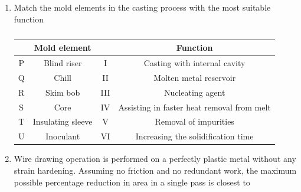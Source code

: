 \documentclass[journal]{IEEEtran}
\begin{document}
\begin{enumerate}[leftmargin=0pt]
\begin{enumerate}
\end{enumerate}
\hfill{}

\item
Match the mold elements in the casting process with the most suitable function
\begin{table}[ht]
\centering
\caption*{}
\label{tab:mold-match}
\begin{tabular}{|c|c|c|c|}
\hline
&Mold element & &Function\\
\hline
P &Blind riser & I& Casting with internal cavity\\
\hline
Q& Chill      & II& Molten metal reservoir\\
\hline
R& Skim bob  & III &Nucleating agent\\
\hline
S &Core      & IV &Assisting in faster heat removal from melt\\
\hline
T &Insulating sleeve & V& Removal of impurities\\
\hline
U& Inoculant  & VI& Increasing the solidification time\\
\hline
\end{tabular}
\end{table}
\begin{enumerate}
\end{enumerate}
\hfill{}

\item
Wire drawing operation is performed on a perfectly plastic metal without any strain hardening. Assuming no friction and no redundant work, the maximum possible percentage reduction in area in a single pass is closest to
\begin{enumerate}
\end{enumerate}
\hfill{}


\end{enumerate}
\end{document}
